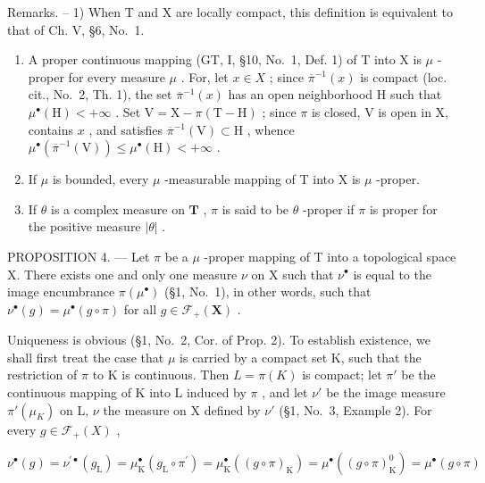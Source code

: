 Remarks. -- 1) When T and X are locally compact, this definition is equivalent to that of Ch. V, §6, No.~1.

\begin{enumerate}
\def\labelenumi{\arabic{enumi})}
\setcounter{enumi}{1}
\item
  A proper continuous mapping (GT, I, §10, No.~1, Def. 1) of T into X is \(\mu\) -proper for every measure \(\mu\) . For, let \(x \in X\) ; since \(\overline{\pi}^{-1}(x)\) is compact (loc. cit., No.~2, Th. 1), the set \(\overline{\pi}^{-1}(x)\) has an open neighborhood H such that \(\mu^{\bullet}(\mathrm{H}) < +\infty\) . Set \(\mathrm{V} = \mathrm{X} - \pi(\mathrm{T} - \mathrm{H})\) ; since \(\pi\) is closed, V is open in X, contains \(x\) , and satisfies \(\overline{\pi}^{-1}(\mathrm{V}) \subset \mathrm{H}\) , whence \(\mu^{\bullet}(\overline{\pi}^{-1}(\mathrm{V})) \leqslant \mu^{\bullet}(\mathrm{H}) < +\infty\) .
\item
  If \(\mu\) is bounded, every \(\mu\) -measurable mapping of T into X is \(\mu\) -proper.
\item
  If \(\theta\) is a complex measure on \(\mathbf{T}\) , \(\pi\) is said to be \(\theta\) -proper if \(\pi\) is proper for the positive measure \(|\theta|\) .
\end{enumerate}

PROPOSITION 4. --- Let \(\pi\) be a \(\mu\) -proper mapping of T into a topological space X. There exists one and only one measure \(\nu\) on X such that \(\nu^{\bullet}\) is equal to the image encumbrance \(\pi(\mu^{\bullet})\) (§1, No.~1), in other words, such that \(\nu^{\bullet}(g) = \mu^{\bullet}(g \circ \pi)\) for all \(g \in \mathcal{F}_{+}(\mathbf{X})\) .

Uniqueness is obvious (§1, No.~2, Cor. of Prop. 2). To establish existence, we shall first treat the case that \(\mu\) is carried by a compact set K, such that the restriction of \(\pi\) to K is continuous. Then \(L = \pi(K)\) is compact; let \(\pi'\) be the continuous mapping of K into L induced by \(\pi\) , and let \(\nu'\) be the image measure \(\pi'(\mu_K)\) on L, \(\nu\) the measure on X defined by \(\nu'\) (§1, No.~3, Example 2). For every \(g \in \mathcal{F}_+(X)\) ,

\[
\nu^ {\bullet} (g) = \nu^ {\prime \bullet} (g _ {\mathrm{L}}) = \mu_ {\mathrm{K}} ^ {\bullet} (g _ {\mathrm{L}} \circ \pi^ {\prime}) = \mu_ {\mathrm{K}} ^ {\bullet} ((g \circ \pi) _ {\mathrm{K}}) = \mu^ {\bullet} ((g \circ \pi) _ {\mathrm{K}} ^ {0}) = \mu^ {\bullet} (g \circ \pi)
\]

